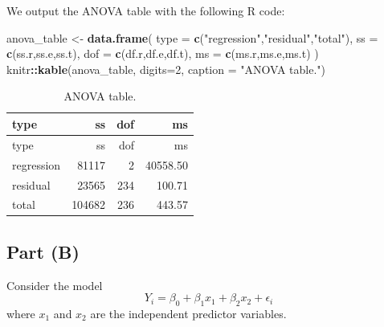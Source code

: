 \documentclass[
]{article}
\newenvironment{Shaded}{\begin{snugshade}}{\end{snugshade}}
\newcommand{\AttributeTok}[1]{\textcolor[rgb]{0.13,0.29,0.53}{#1}}
\newcommand{\DecValTok}[1]{\textcolor[rgb]{0.00,0.00,0.81}{#1}}
\newcommand{\FunctionTok}[1]{\textcolor[rgb]{0.13,0.29,0.53}{\textbf{#1}}}
\newcommand{\NormalTok}[1]{#1}
\newcommand{\OtherTok}[1]{\textcolor[rgb]{0.56,0.35,0.01}{#1}}
\newcommand{\SpecialCharTok}[1]{\textcolor[rgb]{0.81,0.36,0.00}{\textbf{#1}}}
\newcommand{\StringTok}[1]{\textcolor[rgb]{0.31,0.60,0.02}{#1}}
\begin{document}
We output the ANOVA table with the following R code:

\begin{Shaded}
\begin{Highlighting}[]
\NormalTok{anova\_table }\OtherTok{\textless{}{-}} \FunctionTok{data.frame}\NormalTok{(}
   \AttributeTok{type =} \FunctionTok{c}\NormalTok{(}\StringTok{"regression"}\NormalTok{,}\StringTok{"residual"}\NormalTok{,}\StringTok{"total"}\NormalTok{), }
   \AttributeTok{ss =} \FunctionTok{c}\NormalTok{(ss.r,ss.e,ss.t),}
   \AttributeTok{dof =} \FunctionTok{c}\NormalTok{(df.r,df.e,df.t),}
   \AttributeTok{ms =} \FunctionTok{c}\NormalTok{(ms.r,ms.e,ms.t)}
\NormalTok{)}
\NormalTok{knitr}\SpecialCharTok{::}\FunctionTok{kable}\NormalTok{(anova\_table, }\AttributeTok{digits=}\DecValTok{2}\NormalTok{, }\AttributeTok{caption =} \StringTok{"ANOVA table."}\NormalTok{)}
\end{Highlighting}
\end{Shaded}

\begin{longtable}[]{@{}lrrr@{}}
\caption{ANOVA table.}\tabularnewline
\toprule\noalign{}
type & ss & dof & ms \\
\midrule\noalign{}
\endfirsthead
\toprule\noalign{}
type & ss & dof & ms \\
\midrule\noalign{}
\endhead
\bottomrule\noalign{}
\endlastfoot
regression & 81117 & 2 & 40558.50 \\
residual & 23565 & 234 & 100.71 \\
total & 104682 & 236 & 443.57 \\
\end{longtable}

\hypertarget{part-b-1}{%
\subsection{Part (B)}\label{part-b-1}}


Consider the model \begin{equation}
  Y_i = \beta_0 + \beta_1 x_1 + \beta_2 x_2 + \epsilon_i
\end{equation} where \(x_1\) and \(x_2\) are the independent predictor
variables.
\end{document}
